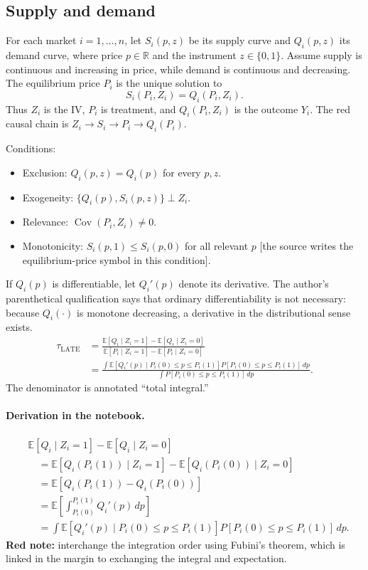 \subsection{Supply and demand}
For each market $i=1,\ldots,n$, let $S_i(p,z)$ be its supply curve and $Q_i(p,z)$ its demand curve, where price $p\in\mathbb R$ and the instrument $z\in\{0,1\}$. Assume supply is continuous and increasing in price, while demand is continuous and decreasing. The equilibrium price $P_i$ is the unique solution to
\[
 S_i(P_i,Z_i)=Q_i(P_i,Z_i).
\]
Thus $Z_i$ is the IV, $P_i$ is treatment, and $Q_i(P_i,Z_i)$ is the outcome $Y_i$. The red causal chain is $Z_i\to S_i\to P_i\to Q_i(P_i)$.

Conditions:
\begin{itemize}
 \item Exclusion: $Q_i(p,z)=Q_i(p)$ for every $p,z$.
 \item Exogeneity: $\{Q_i(p),S_i(p,z)\}\perp Z_i$.
 \item Relevance: $\operatorname{Cov}(P_i,Z_i)\ne0$.
 \item Monotonicity: $S_i(p,1)\le S_i(p,0)$ for all relevant $p$ [the source writes the equilibrium-price symbol in this condition].
\end{itemize}
If $Q_i(p)$ is differentiable, let $Q_i'(p)$ denote its derivative. The author's parenthetical qualification says that ordinary differentiability is not necessary: because $Q_i(\cdot)$ is monotone decreasing, a derivative in the distributional sense exists.
\begin{align*}
 \tau_{\mathrm{LATE}}
 &=\frac{\mathbb E[Q_i\mid Z_i=1]-\mathbb E[Q_i\mid Z_i=0]}
 {\mathbb E[P_i\mid Z_i=1]-\mathbb E[P_i\mid Z_i=0]}\\
 &=\frac{\displaystyle\int
 \mathbb E[Q_i'(p)\mid P_i(0)\le p\le P_i(1)]
 P[P_i(0)\le p\le P_i(1)]\,dp}
 {\displaystyle\int P[P_i(0)\le p\le P_i(1)]\,dp}.
\end{align*}
The denominator is annotated ``total integral.''

\paragraph{Derivation in the notebook.}
\begin{align*}
 &\mathbb E[Q_i\mid Z_i=1]-\mathbb E[Q_i\mid Z_i=0]\\
 &\quad=\mathbb E[Q_i(P_i(1))\mid Z_i=1]
 -\mathbb E[Q_i(P_i(0))\mid Z_i=0]\\
 &\quad=\mathbb E[Q_i(P_i(1))-Q_i(P_i(0))]\\
 &\quad=\mathbb E\left[\int_{P_i(0)}^{P_i(1)}Q_i'(p)\,dp\right]\\
 &\quad=\int\mathbb E[Q_i'(p)\mid P_i(0)\le p\le P_i(1)]
 P[P_i(0)\le p\le P_i(1)]\,dp.
\end{align*}
\textbf{Red note:} interchange the integration order using Fubini's theorem, which is linked in the margin to exchanging the integral and expectation.

